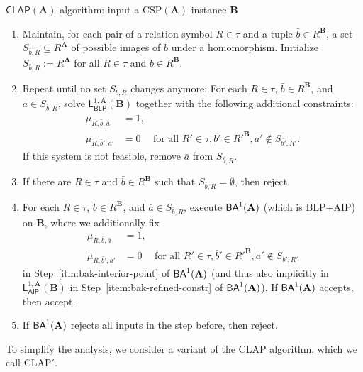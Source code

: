 \documentclass[a4paper,english, thm-restate]{lipics-v2021}
\newcommand{\tup}[1]{\bar{#1}}
\newcommand{\sig}{\tau}
\newcommand{\StructA}{\mathbf{A}}
\newcommand{\StructB}{\mathbf{B}}
\newcommand{\CSP}[1]{\mathrm{CSP}(#1)}
\newcommand{\leqs}{\mathsf{L}}
\newcommand{\blk}[3]{\leqs^{#1,#2}_{\mathsf{BLP}} (#3)}
\newcommand{\aipk}[3]{\leqs^{#1,#2}_{\mathsf{AIP}} (#3)}
\newcommand{\CLAP}[1]{\mathsf{CLAP}(#1)}
\begin{document}
	\begin{algobox}{$\CLAP{\StructA}$-algorithm:
			input a $\CSP{\StructA}$-instance $\StructB$}
		\begin{enumerate}
			\item Maintain, for each pair of a relation symbol $R\in \sig$ and a  tuple $\tup{b} \in R^\StructB$,
			a set $S_{\tup{b},R} \subseteq R^\StructA$ of possible images of $\tup{b}$ under a homomorphism.
			Initialize $S_{\tup{b},R} := R^\StructA$ for all $R\in \sig$ and $\tup{b} \in R^\StructB$. \label{itm:clap-init}
			\item Repeat until no set $S_{\tup{b},R}$ changes anymore:
			For each $R\in\sig$, $\tup{b} \in R^\StructB$, and $\tup{a} \in S_{\tup{b},R}$, solve $\blk{1}{\StructA}{\StructB}$ together with the following additional constraints:
			\begin{align*}
				\mu_{R,\tup{b},\tup{a}} &= 1,\\
				\mu_{R,\tup{b}',\tup{a}'} &= 0 &\text{for all } R' \in \sig, \tup{b}'\in R'^\StructB, \tup{a}' \not\in S_{\tup{b'},R'}.
			\end{align*}
			If this system is not feasible, remove $\tup{a}$ from $S_{\tup{b},R}$.\label{itm:clap-refine-images}
			\item If there are $R\in\sig$ and $\tup{b}\in R^\StructB$ such that $S_{\tup{b},R} =\emptyset$, then reject\label{itm:clap-no-possible-image}.
			\item For each $R \in \sig$, $\tup{b} \in R^\StructB$, and $\tup{a} \in S_{\tup{b},R}$, execute $\BAk{1}{\StructA}$ (which is BLP+AIP) on $\StructB$, where we additionally fix
			\begin{align*}
				\mu_{R,\tup{b},\tup{a}} &= 1,\\
				\mu_{R,\tup{b}',\tup{a}'} & = 0 &\text{for all } R' \in \sig, \tup{b}' \in R'^\StructB, \tup{a}' \not\in S_{\tup{b}',R'}
			\end{align*}
			in Step~\ref{itm:bak-interior-point} of $\BAk{1}{\StructA}$
			(and thus also implicitly in $\aipk{1}{\StructA}{\StructB}$ in Step~\ref{item:bak-refined-constr} of $\BAk{1}{\StructA}$).
			If $\BAk{1}{\StructA}$ accepts, then accept.\label{itm:clap-call-bak}
			\item If $\BAk{1}{\StructA}$ rejects all inputs in the step before, then reject.\label{itm:clap-reject}
		\end{enumerate}
	\end{algobox}
	
	\noindent To simplify the analysis,
	we consider a variant of the CLAP algorithm,
	which we call CLAP$'$.
	
\end{document}
